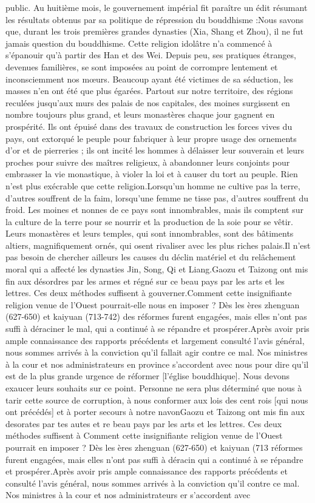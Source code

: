 public. Au huitième mois, le gouvernement impérial fit paraître un édit résumant les résultats obtenus par sa politique de répression du bouddhisme :Nous savons que, durant les trois premières grandes dynasties (Xia, Shang et Zhou), il ne fut jamais question du bouddhisme. Cette religion idolâtre n'a commencé à s'épanouir qu'à partir des Han et des Wei. Depuis peu, ses pratiques étranges, devenues familières, se sont imposées au point de corrompre lentement et inconsciemment nos mœurs. Beaucoup ayant été victimes de sa séduction, les masses n'en ont été que plus égarées. Partout sur notre territoire, des régions reculées jusqu'aux murs des palais de nos capitales, des moines surgissent en nombre toujours plus grand, et leurs monastères chaque jour gagnent en prospérité. Ils ont épuisé dans des travaux de construction les forces vives du pays, ont extorqué le peuple pour fabriquer à leur propre usage des ornements d'or et de pierreries ; ils ont incité les hommes à délaisser leur souverain et leurs proches pour suivre des maîtres religieux, à abandonner leurs conjoints pour embrasser la vie monastique, à violer la loi et à causer du tort au peuple. Rien n'est plus exécrable que cette religion.Lorsqu'un homme ne cultive pas la terre, d'autres souffrent de la faim, lorsqu'une femme ne tisse pas, d'autres souffrent du froid. Les moines et nonnes de ce pays sont innombrables, mais ils comptent sur la culture de la terre pour se nourrir et la production de la soie pour se vêtir. Leurs monastères et leurs temples, qui sont innombrables, sont des bâtiments altiers, magnifiquement ornés, qui osent rivaliser avec les plus riches palais.Il n'est pas besoin de chercher ailleurs les causes du déclin matériel et du relâchement moral qui a affecté les dynasties Jin, Song, Qi et Liang.Gaozu et Taizong ont mis fin aux désordres par les armes et régné sur ce beau pays par les arts et les lettres. Ces deux méthodes suffisent à gouverner.Comment cette insignifiante religion venue de l'Ouest pourrait-elle nous en imposer ? Dès les ères zhenguan (627-650) et kaiyuan (713-742) des réformes furent engagées, mais elles n'ont pas suffi à déraciner le mal, qui a continué à se répandre et prospérer.Après avoir pris ample connaissance des rapports précédents et largement consulté l'avis général, nous sommes arrivés à la conviction qu'il fallait agir contre ce mal. Nos ministres à la cour et nos administrateurs en province s'accordent avec nous pour dire qu'il est de la plus grande urgence de réformer [l'église bouddhique]. Nous devons exaucer leurs souhaits sur ce point. Personne ne sera plus déterminé que nous à tarir cette source de corruption, à nous conformer aux lois des cent rois [qui nous ont précédés] et à porter secours à notre navonGaozu et Taizong ont mis fin aux desorates par tes autes et re beau pays par les arts et les lettres. Ces deux méthodes suffisent à Comment cette insignifiante religion venue de l'Ouest pourrait en imposer ? Dès les ères zhenguan (627-650) et kaiyuan (713 réformes furent engagées, mais elles n'ont pas suffi à déracin qui a continué à se répandre et prospérer.Après avoir pris ample connaissance des rapports précédents et consulté l'avis général, nous sommes arrivés à la conviction qu'il contre ce mal. Nos ministres à la cour et nos administrateurs er s'accordent avec 